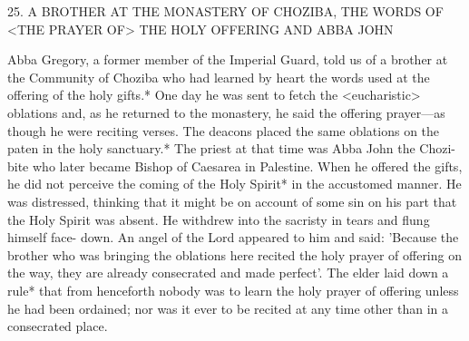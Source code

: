 25.
A BROTHER AT THE MONASTERY
OF CHOZIBA, THE WORDS OF
<THE PRAYER OF> THE HOLY OFFERING
AND ABBA JOHN

Abba Gregory, a former member of the Imperial Guard, told us of
a brother at the Community of Choziba who had learned by heart
the words used at the offering of the holy gifts.* One day he was
sent to fetch the <eucharistic> oblations and, as he returned to the
monastery, he said the offering prayer—as though he were reciting
verses.
The deacons placed the same oblations on the paten in the
holy sanctuary.* The priest at that time was Abba John the Chozi-
bite who later became Bishop of Caesarea in Palestine.
When he
offered the gifts, he did not perceive the coming of the Holy Spirit*
in the accustomed manner.
He was distressed, thinking that it might
be on account of some sin on his part that the Holy Spirit was
absent.
He withdrew into the sacristy in tears and flung himself face-
down.
An angel of the Lord appeared to him and said: 'Because the
brother who was bringing the oblations here recited the holy prayer
of offering on the way, they are already consecrated and made
perfect'.
The elder laid down a rule* that from henceforth nobody
was to learn the holy prayer of offering unless he had been
ordained; nor was it ever to be recited at any time other than in a
consecrated place.

